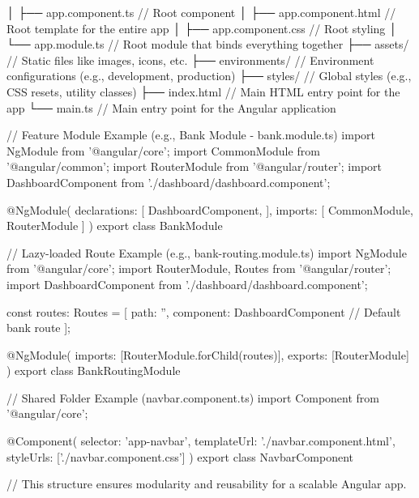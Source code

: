 │   ├── app.component.ts                 // Root component
│   ├── app.component.html               // Root template for the entire app
│   ├── app.component.css                // Root styling
│   └── app.module.ts                    // Root module that binds everything together
├── assets/                             // Static files like images, icons, etc.
├── environments/                       // Environment configurations (e.g., development, production)
├── styles/                             // Global styles (e.g., CSS resets, utility classes)
├── index.html                          // Main HTML entry point for the app
└── main.ts                             // Main entry point for the Angular application



// Feature Module Example (e.g., Bank Module - bank.module.ts)
import { NgModule } from '@angular/core';
import { CommonModule } from '@angular/common';
import { RouterModule } from '@angular/router';
import { DashboardComponent } from './dashboard/dashboard.component';

@NgModule({
    declarations: [
        DashboardComponent,
    ],
    imports: [
        CommonModule,
        RouterModule
    ]
})
export class BankModule { }

// Lazy-loaded Route Example (e.g., bank-routing.module.ts)
import { NgModule } from '@angular/core';
import { RouterModule, Routes } from '@angular/router';
import { DashboardComponent } from './dashboard/dashboard.component';

const routes: Routes = [
    { path: '', component: DashboardComponent } // Default bank route
];

@NgModule({
    imports: [RouterModule.forChild(routes)],
    exports: [RouterModule]
})
export class BankRoutingModule { }

// Shared Folder Example (navbar.component.ts)
import { Component } from '@angular/core';

@Component({
    selector: 'app-navbar',
    templateUrl: './navbar.component.html',
    styleUrls: ['./navbar.component.css']
})
export class NavbarComponent { }

// This structure ensures modularity and reusability for a scalable Angular app.
